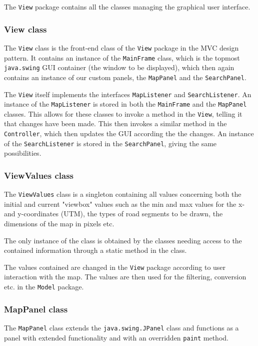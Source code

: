 The \texttt{View} package contains all the classes managing the graphical user interface.


\subsubsection{View class} %
The \texttt{View} class is the front-end class of the \texttt{View} package in the MVC design pattern. It contains an instance of the \texttt{MainFrame} class, which is the topmost \texttt{java.swing} GUI container (the window to be displayed), which then again contains an instance of our custom panels, the \texttt{MapPanel} and the \texttt{SearchPanel}.

The \texttt{View} itself implements the interfaces \texttt{MapListener} and \texttt{SearchListener}. An instance of the \texttt{MapListener} is stored in both the \texttt{MainFrame} and the \texttt{MapPanel} classes. This allows for these classes to invoke a method in the \texttt{View}, telling it that changes have been made. This then invokes a similar method in the \texttt{Controller}, which then updates the GUI according the the changes. An instance of the \texttt{SearchListener} is stored in the \texttt{SearchPanel}, giving the same possibilities.

\subsubsection{ViewValues class}
The \texttt{ViewValues} class is a singleton containing all values concerning both the initial and current "viewbox" values such as the min and max values for the x- and y-coordinates (UTM), the types of road segments to be drawn, the dimensions of the map in pixels etc.

The only instance of the class is obtained by the classes needing access to the contained information through a static method in the class.

The values contained are changed in the \texttt{View} package according to user interaction with the map. The values are then used for the filtering, conversion etc. in the \texttt{Model} package.

\subsubsection{MapPanel class} %
The \texttt{MapPanel} class extends the \texttt{java.swing.JPanel} class and functions as a panel with extended functionality and with an overridden \texttt{paint} method.

